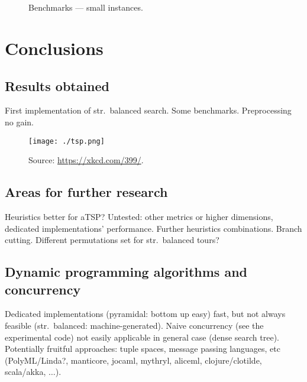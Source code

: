 \documentclass{scrartcl}
\newcommand{\annotation}[1]{\marginpar{\small\itshape\color{green}#1}}
\begin{document}
\begin{figure}[htbp]
\null\hfill%
\hfill\null\\
\null\hfill%
\hfill\null\\
\null\hfill%
\hfill\null
\caption{Benchmarks --- small instances.}
\label{fig:benchTSPLIB}
\end{figure}

\clearpage
\section{Conclusions}

\subsection{Results obtained}
\annotation{TODO}
First implementation of str.~balanced search.
Some benchmarks.
Preprocessing no gain.

\begin{figure}[htbp]
\centering
\texttt{[image: ./tsp.png]}
\caption*{\captionsize Source: \small \url{https://xkcd.com/399/}.}
\end{figure}

\subsection{Areas for further research}
\annotation{TODO}

Heuristics better for aTSP\@?
Untested: other metrics or higher dimensions, dedicated implementations' performance.
Further heuristics combinations.
Branch cutting.
Different permutations set for str.~balanced tours?

\subsection{Dynamic programming algorithms and concurrency}
\annotation{TODO}

Dedicated implementations (pyramidal: bottom up easy) fast, but not always feasible (str.~balanced: machine-generated).
Naive concurrency (see the {\ttfamily experimental} code) not easily applicable in general case (dense search tree).
Potentially fruitful approaches: tuple spaces, message passing languages, etc
(PolyML/Linda?, manticore, jocaml, mythryl, aliceml, clojure/clotilde, scala/akka, $\ldots$).
\end{document}
